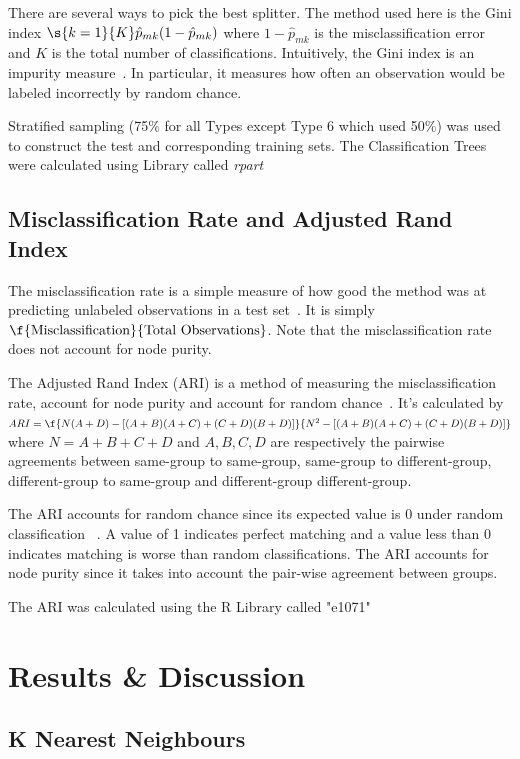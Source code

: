 \documentclass[12pt]{article}
\begin{document}
There are several ways to pick the best splitter. The method used here is the Gini index 
$ \s{k=1}{K} \hat{p}_{mk}(1 - \hat{p}_{mk}) $ 
where $ 1 - \hat{p}_{mk} $ is the misclassification error and $ K $ is the total number of classifications. 
Intuitively, the Gini index is an impurity measure~\cite{Lecture}. In particular, it measures how often an observation would be labeled incorrectly by random chance. 

Stratified sampling (75\% for all Types except Type 6 which used 50\%) was used to construct the test and corresponding training sets. The Classification Trees were calculated using Library called \textit{rpart} ~\cite{R_Class_Tree}

\subsection{Misclassification Rate and Adjusted Rand Index}
The misclassification rate is a simple measure of how good the method was at predicting unlabeled observations in a test set~\cite{Lecture}. 
It is simply $ \f{\text{Misclassification}}{\text{Total Observations}} $. Note that the misclassification rate does not account for node purity. 

The Adjusted Rand Index (ARI) is a method of measuring the misclassification rate, account for node purity and account for random chance~\cite{Lecture}. It's calculated by 
$ ARI = \f{N(A + D) - [(A+B)(A+C) + (C+D)(B+D)]}{N^2-[(A+B)(A+C) + (C+D)(B+D)]} $ where $ N = A + B + C + D $ and $ A, B, C, D $ are respectively the pairwise agreements between same-group to same-group, same-group to different-group, different-group to same-group and different-group different-group. 

The ARI accounts for random chance since its expected value is 0 under random classification ~\cite{Lecture}. A value of 1 indicates perfect matching and a value less than 0 indicates matching is worse than random classifications.
The ARI accounts for node purity since it takes into account the pair-wise agreement between groups. 

The ARI was calculated using the R Library called "e1071" ~\cite{R_ARI	}

\section{Results \& Discussion}
\subsection{K Nearest Neighbours}
\end{document}
